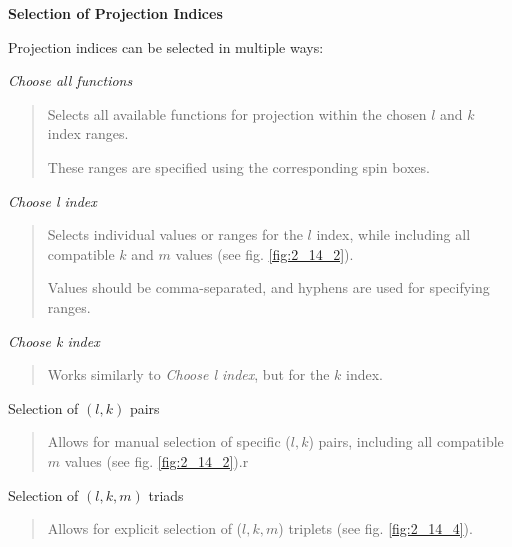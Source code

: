 \documentclass[10pt]{article}
\begin{document}
{\bf Selection of Projection Indices}
\vspace*{3mm}

Projection indices can be selected in multiple ways:

\begin{enumerate}
\item {\it Choose all functions}
\vspace*{-5mm}
\begin{quote}
\item Selects all available functions for projection within the chosen $l$ and $k$ index ranges.
\item These ranges are specified using the corresponding spin boxes.
\end{quote}

\item {\it Choose l index}
\vspace*{-5mm}
\begin{quote}
\item Selects individual values or ranges for the $l$ index,
while including all compatible $k$ and $m$ values (see fig. \ref{fig:2_14_2}).
\item Values should be comma-separated, and hyphens are used for specifying ranges.
\end{quote}

\item {\it Choose k index}
\vspace*{-5mm}
\begin{quote}
\item Works similarly to {\it Choose l index}, but for the $k$ index.
\end{quote}

\item Selection of $(l,k)$ pairs
\vspace*{-5mm}
\begin{quote}
\item Allows for manual selection of specific ($l,k$) pairs,
including all compatible $m$ values (see fig. \ref{fig:2_14_2}).r
\end{quote}

\item Selection of $(l,k,m)$ triads
\vspace*{-5mm}
\begin{quote}
\item Allows for explicit selection of ($l,k,m$) triplets
(see fig. \ref{fig:2_14_4}).
\end{quote}
\end{enumerate}
\end{document}

